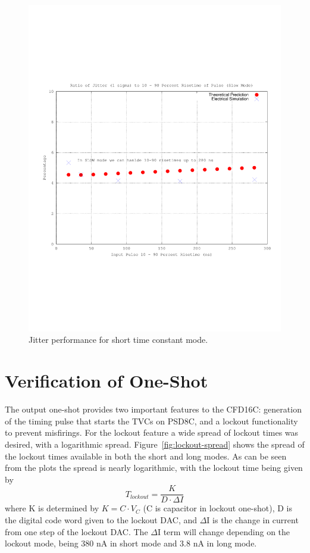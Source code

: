 \documentclass[12pt,oneside,final]{siuethesis}
\theoremstyle{definition}
\begin{document}
\begin{figure}[htbp!]
	\centering
 	\includegraphics[scale=0.7,keepaspectratio=true]{../Design_Reports/CFD_circuit_report/images/jitter_slow_mode.pdf}
 	\caption{Jitter performance for short time constant mode.}
 	\label{FIG:JITTER_SLOW}
\end{figure}

\section{Verification of One-Shot}

\par The output one-shot provides two important features to the CFD16C: generation of the timing pulse that starts the TVCs on PSD8C, and a lockout functionality to prevent misfirings. For the lockout feature a wide spread of lockout times was desired, with a logarithmic spread. Figure~\ref{fig:lockout-spread} shows the spread of the lockout times available in both the short and long modes. As can be seen from the plots the spread is nearly logarithmic, with the lockout time being given by 
\begin{equation}
T_{lockout} = \frac{K}{D\cdot \Delta I}
\end{equation}
where K is determined by $K = C\cdot V_{C}$ (C is capacitor in lockout one-shot), D is the digital code word given to the lockout DAC, and $\Delta$I is the change in current from one step of the lockout DAC. The $\Delta$I term will change depending on the lockout mode, being 380 nA in short mode and 3.8 nA in long mode. 
\end{document}
